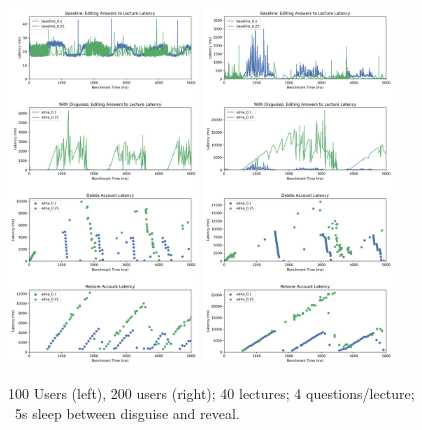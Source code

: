 \begin{figure}[t!]
    \centering
    \includegraphics[width=0.45\textwidth]{figs/concurrent_results_40lec_100users}
    \includegraphics[width=0.45\textwidth]{figs/concurrent_results_40lec_200users}
    \caption{100 Users (left), 200 users (right); 
    40 lectures; 4 questions/lecture; ~5s sleep between disguise and reveal. }
\end{figure}


